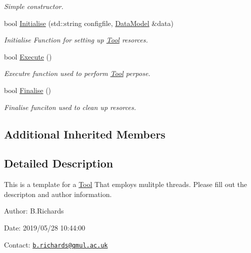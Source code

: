 \begin{DoxyCompactItemize}
\begin{DoxyCompactList}\small\item\em Simple constructor. \end{DoxyCompactList}\item 
bool \hyperlink{classMyToolMultiThread_a19dc55079a7b2da02ad9addd565b8e80}{Initialise} (std\-::string configfile, \hyperlink{classDataModel}{Data\-Model} \&data)
\begin{DoxyCompactList}\small\item\em Initialise Function for setting up \hyperlink{classTool}{Tool} resorces. \end{DoxyCompactList}\item 
\hypertarget{classMyToolMultiThread_a9cd7c894fc4797b2d81e12e25eb5beec}{bool \hyperlink{classMyToolMultiThread_a9cd7c894fc4797b2d81e12e25eb5beec}{Execute} ()}\label{classMyToolMultiThread_a9cd7c894fc4797b2d81e12e25eb5beec}

\begin{DoxyCompactList}\small\item\em Executre function used to perform \hyperlink{classTool}{Tool} perpose. \end{DoxyCompactList}\item 
\hypertarget{classMyToolMultiThread_a8f25561dc6a5daf8f4db85afecbb2c38}{bool \hyperlink{classMyToolMultiThread_a8f25561dc6a5daf8f4db85afecbb2c38}{Finalise} ()}\label{classMyToolMultiThread_a8f25561dc6a5daf8f4db85afecbb2c38}

\begin{DoxyCompactList}\small\item\em Finalise funciton used to clean up resorces. \end{DoxyCompactList}\end{DoxyCompactItemize}
\subsection*{Additional Inherited Members}


\subsection{Detailed Description}
This is a template for a \hyperlink{classTool}{Tool} That employs mulitple threads. Please fill out the descripton and author information.

\begin{DoxyParagraph}{Author\-:}
B.\-Richards 
\end{DoxyParagraph}
\begin{DoxyParagraph}{Date\-:}
2019/05/28 10\-:44\-:00 
\end{DoxyParagraph}
Contact\-: \href{mailto:b.richards@qmul.ac.uk}{\tt b.\-richards@qmul.\-ac.\-uk} 

